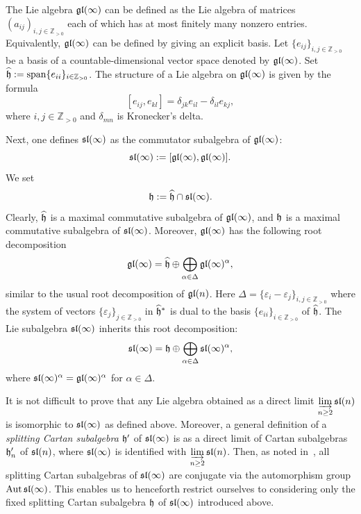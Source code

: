 \documentclass[10pt]{amsart}\oddsidemargin -1mm \evensidemargin -1mm \topmargin -15mm\headheight5mm \headsep 3.5mm \textheight 245mm\textwidth 170mm %
\theoremstyle{definition}\newtheorem{theorem}{Theorem}[section]\newtheorem{lemma}[theorem]{Lemma}\newtheorem{remark}[theorem]{Remark}\newtheorem{proposition}[theorem]{Proposition}\newtheorem{corollary}[theorem]{Corollary}\newtheorem{definition}[theorem]{Definition}\newtheorem{Ex}[theorem]{Example}
\newcommand{\APbr}[1]{\mathrm{span}\{#1\}}
\newcounter{AP}
\begin{document}
The Lie algebra $\frak{gl}(\infty)$ can be defined  as the Lie algebra of matrices $(a_{ij})_{i, j\in\mathbb Z_{>0}}$ each of which has at most finitely many nonzero entries. Equivalently, $\frak{gl}(\infty)$ can be defined by giving an explicit basis. Let $\{e_{ij}\}_{i, j\in\mathbb Z_{>0}}$ be a basis of a countable-dimensional vector space denoted by $\frak{gl}(\infty)$. Set $\widehat{\frak h}:=\APbr{e_{ii}}_{i\in\mathbb Z_{>0}}$. The structure of a Lie algebra on $\frak{gl}(\infty)$ is given by the formula
$$[e_{ij},
e_{kl}]=\delta_{jk}e_{il}-\delta_{il}e_{kj},$$
where $i, j\in\mathbb Z_{>0} $ and $\delta_{mn}$ is Kronecker's delta.

Next, one defines $\frak{sl}(\infty)$ as the commutator subalgebra of $\frak{gl}(\infty)$: $$\frak{sl}(\infty):=[\frak{gl}(\infty), \frak{gl}(\infty)].$$ We set$$\frak h:=\widehat{\frak h}\cap\frak{sl}(\infty).$$ Clearly, $\widehat{\frak h}$ is a maximal commutative subalgebra of $\frak{gl}(\infty)$, and $\frak h$ is a maximal commutative subalgebra of $\frak{sl}(\infty)$. Moreover, $\frak{gl}(\infty)$ has the following root decomposition $$\frak{gl}(\infty)=\widehat{\frak h}\oplus\bigoplus_{\alpha\in\Delta}\frak{gl}(\infty)^{\alpha},$$
similar to the usual root decomposition of $\frak{gl}(n)$. Here $\Delta=\{\varepsilon_i-\varepsilon_j\}_{i, j\in\mathbb Z_{>0}}$ where the system of vectors $\{\varepsilon_j\}_{j\in\mathbb Z_{>0}}$ in $\widehat{\frak h}^*$ is dual to the basis $\{e_{ii}\}_{i\in\mathbb Z_{>0}}$ of $\widehat{\frak h}$. The Lie subalgebra $\frak{sl}(\infty)$ inherits this root decomposition:$$\frak{sl}(\infty)=\frak h\oplus\bigoplus_{\alpha\in\Delta}\frak{sl}(\infty)^{\alpha},$$where $\frak{sl}(\infty)^\alpha=\frak{gl}(\infty)^\alpha$ for $\alpha\in\Delta$.

It is not difficult to prove that any Lie algebra obtained as a direct limit $\varinjlim\limits_{n\ge2}\frak{sl}(n)$ is isomorphic to $\frak{sl}(\infty)$ as defined above. Moreover, a general definition of a {\it splitting Cartan subalgebra} $\frak h'$ of $\frak{sl}(\infty)$ is as a  direct limit of Cartan subalgebras $\frak h_n'$ of $\frak{sl}(n)$, where $\frak{sl}(\infty)$ is identified with $\varinjlim\limits_{n\ge2}\frak{sl}(n)$. Then, as noted in~\cite{DPSn}, all splitting Cartan subalgebras of $\frak{sl}(\infty)$ are conjugate via the automorphism group $\operatorname{\mathrm{Aut}} \frak{sl}(\infty)$. This enables us to henceforth restrict ourselves to considering only the fixed splitting Cartan subalgebra $\frak h$ of $\frak{sl}(\infty)$ introduced above.
\end{document}
